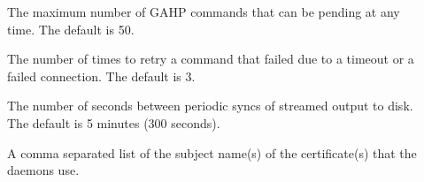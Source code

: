 \begin{description}
\item[]
\label{param:GridmanagerMaxPendingRequests} The maximum number of GAHP
commands that can be pending at any time. The default is 50.

\item[]
\label{param:GridmanagerConnectFailureRetryCount} The number of times
to retry a command that failed due to a timeout or a failed connection.
The default is 3.

\item[]
\label{param:GridmanagerSyncJobIoInterval} The number of seconds between
periodic syncs of streamed output to disk. The default is 5 minutes
(300 seconds).



\item[]
\label{param:GSIDaemonName} A comma separated list of the subject
name(s) of the certificate(s) that the daemons use.
\end{description}


